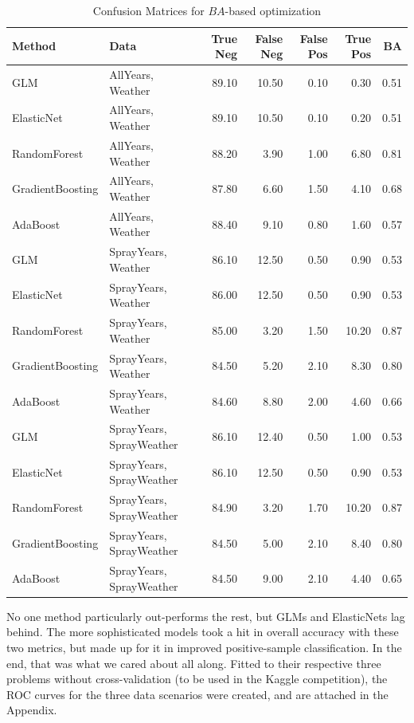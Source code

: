 \documentclass[12pt]{article}
\begin{document}
\begin{table}[H] \center \footnotesize
\begin{tabular}{|ll|rrrrr|} \hline
Method & Data & True Neg & False Neg & False Pos & True Pos & BA \\ \hline
GLM & AllYears, Weather & 89.10 & 10.50 & 0.10 & 0.30 & 0.51 \\ 
  ElasticNet & AllYears, Weather & 89.10 & 10.50 & 0.10 & 0.20 & 0.51 \\ 
  RandomForest & AllYears, Weather & 88.20 & 3.90 & 1.00 & 6.80 & 0.81 \\ 
  GradientBoosting & AllYears, Weather & 87.80 & 6.60 & 1.50 & 4.10 & 0.68 \\ 
  AdaBoost & AllYears, Weather & 88.40 & 9.10 & 0.80 & 1.60 & 0.57 \\ 
  GLM & SprayYears, Weather & 86.10 & 12.50 & 0.50 & 0.90 & 0.53 \\ 
  ElasticNet & SprayYears, Weather & 86.00 & 12.50 & 0.50 & 0.90 & 0.53 \\ 
  RandomForest & SprayYears, Weather & 85.00 & 3.20 & 1.50 & 10.20 & 0.87 \\ 
  GradientBoosting & SprayYears, Weather & 84.50 & 5.20 & 2.10 & 8.30 & 0.80 \\ 
  AdaBoost & SprayYears, Weather & 84.60 & 8.80 & 2.00 & 4.60 & 0.66 \\ 
  GLM & SprayYears, SprayWeather & 86.10 & 12.40 & 0.50 & 1.00 & 0.53 \\ 
  ElasticNet & SprayYears, SprayWeather & 86.10 & 12.50 & 0.50 & 0.90 & 0.53 \\ 
  RandomForest & SprayYears, SprayWeather & 84.90 & 3.20 & 1.70 & 10.20 & 0.87 \\ 
  GradientBoosting & SprayYears, SprayWeather & 84.50 & 5.00 & 2.10 & 8.40 & 0.80 \\ 
  AdaBoost & SprayYears, SprayWeather & 84.50 & 9.00 & 2.10 & 4.40 & 0.65 \\ 
   \hline
\end{tabular}
\caption*{Confusion Matrices for $BA$-based optimization}
\end{table}

No one method particularly out-performs the rest, but GLMs and ElasticNets lag behind. The more sophisticated models took a hit in overall accuracy with these two metrics, but made up for it in improved positive-sample classification. In the end, that was what we cared about all along. Fitted to their respective three problems without cross-validation (to be used in the Kaggle competition), the ROC curves for the three data scenarios were created, and are attached in the Appendix. 
\end{document}
